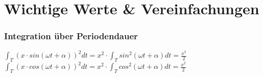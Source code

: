 
\section*{Wichtige Werte \& Vereinfachungen}

\subsubsection*{Integration über Periodendauer}
$\int_T (x \cdot sin(\omega t + \alpha))^2 dt = x^2 \cdot \int_T sin^2(\omega t +\alpha) dt = \frac{x^2}{2}$
$\int_T (x \cdot cos(\omega t+\alpha))^2 dt = x^2 \cdot \int_T cos^2(\omega t+\alpha) dt = \frac{x^2}{2}$
